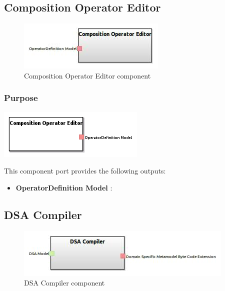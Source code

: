 \documentclass{gemoc} %
\begin{document}
\subsection{Composition Operator Editor}

\begin{figure}[htp]
	\begin{center}
	\includegraphics*[trim=0.0cm 0.0cm 0cm 0.0cm, clip=true, scale=1.0]{../images/generated/Generated_Composition Operator Editor.jpg}
	\caption{Composition Operator Editor component}
	\end{center}
\end{figure}

\subsubsection{Purpose}

\begin{center}
\includegraphics*[trim=0.0cm 0.0cm 0cm 0.0cm, clip=true]{../images/generated/Generated_Composition_Operator_Editor.png}
\end{center}


This component port provides the following outputs:
\begin{itemize}
  \item \textbf{OperatorDefinition Model} :
\end{itemize}

\subsection{DSA Compiler}
\begin{figure}[htp]
	\begin{center}
	\includegraphics*[trim=0.0cm 0.0cm 0cm 0.0cm, clip=true, scale=1.0]{../images/generated/Generated_DSA Compiler.jpg}
	\caption{DSA Compiler component}
	\end{center}
\end{figure}
\end{document}
